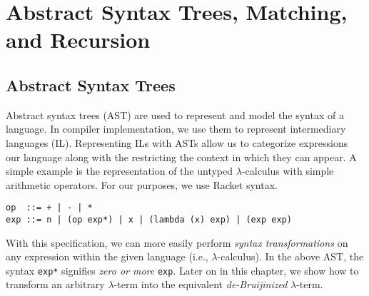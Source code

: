 \documentclass[12pt]{book}
\begin{document}

\chapter{Abstract Syntax Trees, Matching, and Recursion}
\label{ch:trees-recur}

\section{Abstract Syntax Trees}

Abstract syntax trees (AST) are used to represent and model the syntax of a
language. In compiler implementation, we use them to represent intermediary 
languages (IL). Representing ILs with ASTs allow us to categorize expressions
our language along with the restricting the context in which they can 
appear. A simple example is the representation of the untyped 
\mbox{\(\lambda\)-calculus} with simple arithmetic operators. For our 
purposes, we use Racket syntax.

\begin{verbatim}
op  ::= + | - | *
exp ::= n | (op exp*) | x | (lambda (x) exp) | (exp exp)
\end{verbatim}
With this specification, we can more easily perform \textit{syntax 
transformations} on any expression within the given language (i.e., 
\(\lambda\)-calculus). In the above AST, the syntax {\tt exp*} signifies
\textit{zero or more} {\tt exp}. Later on in this chapter,  we show how 
to transform an arbitrary \(\lambda\)-term into the equivalent 
\textit{de-Bruijinized} \(\lambda\)-term.
\end{document}

